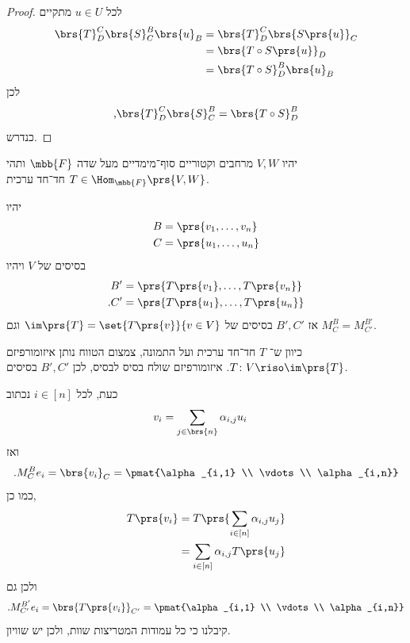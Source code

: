 \documentclass[a4paper,10pt,twoside,openany]{book}
\begin{document}
\begin{proof}
לכל
$u \in U$
מתקיים
\begin{align*}
\brs{T}^C_D \brs{S}^B_C \brs{u}_B &= \brs{T}^C_D \brs{S\prs{u}}_C
\\&= \brs{T \circ S \prs{u}}_D
\\&= \brs{T \circ S}^B_D \brs{u}_B
\end{align*}
לכן
\[\text{,} \brs{T}^C_D \brs{S}^B_C = \brs{T \circ S}^B_D\]
כנדרש.
\end{proof}

\begin{proposition}
יהיו
$V,W$
מרחבים וקטוריים סוף־מימדיים מעל שדה
$\mbb{F}$
ותהי
$T \in \Hom_{\mbb{F}}\prs{V,W}$
חד־חד ערכית.

יהיו
\begin{align*}
B &= \prs{v_1, \ldots, v_n} \\
C &= \prs{u_1, \ldots, u_n}
\end{align*}
בסיסים של
$V$
ויהיו
\begin{align*}
B' &= \prs{T\prs{v_1}, \ldots, T\prs{v_n}} \\
\text{.} C' &= \prs{T\prs{u_1}, \ldots, T\prs{u_n}}
\end{align*}
אז
$B',C'$
בסיסים של
$\im\prs{T} = \set{T\prs{v}}{v \in V}$
וגם
$M^B_C = M^{B'}_{C'}$.
\end{proposition}

\begin{solution}
כיוון ש־%
$T$
חד־חד ערכית ועל התמונה, צמצום הטווח נותן איזומורפיזם
$T \colon V \riso \im\prs{T}$.
איזומורפיזם שולח בסיס לבסיס, לכן
$B',C'$
בסיסים.

כעת, לכל
$i \in [n]$
נכתוב
\begin{align*}
v_i &= \sum_{j \in \brs{n}} \alpha_{i,j} u_i
\end{align*}
ואז
\begin{align*}
\text{.} M^B_C e_i = \brs{v_i}_C = \pmat{\alpha_{i,1} \\ \vdots \\ \alpha_{i,n}}
\end{align*}
כמו כן,
\begin{align*}
T\prs{v_i}
&=
T\prs{\sum_{i \in [n]} \alpha_{i,j} u_j}
\\&=
\sum_{i \in [n]} \alpha_{i,j} T\prs{u_j}
\end{align*}
ולכן גם
\[\text{.} M^{B'}_{C'} e_i = \brs{T\prs{v_i}}_{C'} = \pmat{\alpha_{i,1} \\ \vdots \\ \alpha_{i,n}}\]
קיבלנו כי כל עמודות המטריצות שוות, ולכן יש שוויון.
\end{solution}
\end{document}
